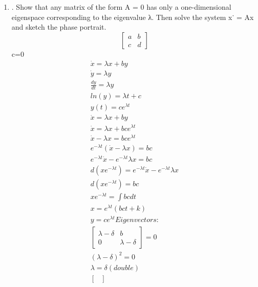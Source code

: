\documentclass[a4paper,10pt]{article}
\begin{document}
\begin{enumerate}
    \item . Show that any matrix of the form A = 0 has only a one-dimensional eigenspace corresponding to the eigenvalue λ. Then solve the system x˙ = Ax and sketch the phase portrait.
        \begin{equation}
            \begin{bmatrix}
                a & b\\
                c & d
            \end{bmatrix}
        \end{equation}
        c=0\\
        \begin{equation}
            \begin{aligned}
                \dot{x}=\lambda x + by\\
                \dot{y}=\lambda y\\
                \frac{dy}{dt}=\lambda y\\
                ln(y)= \lambda t +c \\
                y(t)= ce^{\lambda t}\\
                \dot{x}=\lambda x + by\\
                \dot{x}=\lambda x + bce^{\lambda t}\\
                \dot{x}-\lambda x = bce^{\lambda t}\\
                e^{-\lambda t}(\dot{x}-\lambda x)=bc\\
                e^{-\lambda t}\dot{x}-e^{-\lambda t}\lambda x=bc\\
                d(xe^{-\lambda t})=e^{-\lambda t}\dot{x}-e^{-\lambda t}\lambda x\\
                d(xe^{-\lambda t})=bc\\
                xe^{-\lambda t}=\int bcdt\\
                x=e^{\lambda t}(bct+k)\\
                y= ce^{\lambda t}
                Eigenvectors:\\
                \begin{bmatrix}
                    \lambda-\delta & b\\
                    0 & \lambda-\delta
                \end{bmatrix}
                =0\\
                (\lambda-\delta)^{2}=0\\
                \lambda=\delta (double)\\
                \begin{bmatrix}

\end{bmatrix}
\end{aligned}
\end{equation}
\end{enumerate}
\end{document}
